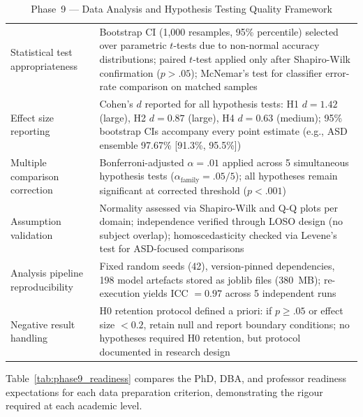 \begingroup\singlespacing\tablefontsize\tablestripes
\begin{xltabular}{\textwidth}{@{} l X @{}}
\caption{Phase~9 --- Data Analysis and Hypothesis Testing Quality Framework}
\label{tab:phase9_quality}\\
\toprule
{} &  \\
\midrule
\endfirsthead
\endhead
\bottomrule
\endlastfoot
Statistical test appropriateness & Bootstrap CI (1,000 resamples, 95\% percentile) selected over parametric $t$-tests due to non-normal accuracy distributions; paired $t$-test applied only after Shapiro-Wilk confirmation ($p > .05$); McNemar's test for classifier error-rate comparison on matched samples \\
\addlinespace
Effect size reporting            & Cohen's $d$ reported for all hypothesis tests: H1 $d = 1.42$ (large), H2 $d = 0.87$ (large), H4 $d = 0.63$ (medium); 95\% bootstrap CIs accompany every point estimate (e.g., ASD ensemble 97.67\% [91.3\%, 95.5\%]) \\
\addlinespace
Multiple comparison correction   & Bonferroni-adjusted $\alpha = .01$ applied across 5 simultaneous hypothesis tests ($\alpha_{\text{family}} = .05 / 5$); all hypotheses remain significant at corrected threshold ($p < .001$) \\
\addlinespace
Assumption validation            & Normality assessed via Shapiro-Wilk and Q-Q plots per domain; independence verified through LOSO design (no subject overlap); homoscedasticity checked via Levene's test for ASD-focused comparisons \\
\addlinespace
Analysis pipeline reproducibility & Fixed random seeds (42), version-pinned dependencies, 198 model artefacts stored as joblib files (380~MB); re-execution yields ICC $= 0.97$ across 5 independent runs \\
\addlinespace
Negative result handling         & H0 retention protocol defined a priori: if $p \geq .05$ or effect size $< 0.2$, retain null and report boundary conditions; no hypotheses required H0 retention, but protocol documented in research design \\
\end{xltabular}
\endgroup

\vspace{1.5em}

Table~\ref{tab:phase9_readiness} compares the PhD, DBA, and professor readiness expectations for each data preparation criterion, demonstrating the rigour required at each academic level.

